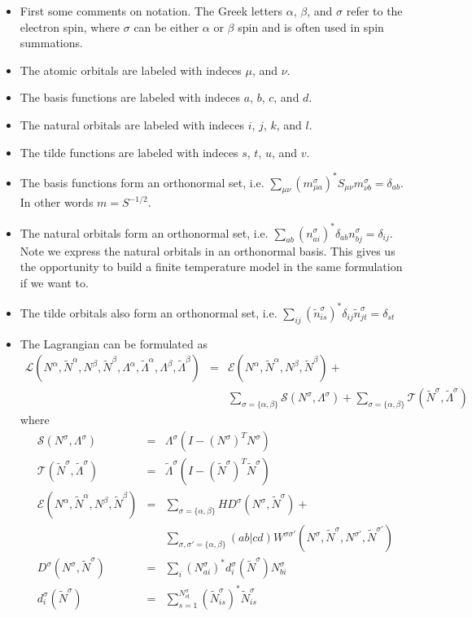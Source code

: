 \documentclass[aip,graphicx]{revtex4-1}
\newcommand{\nnq}[2]{n_{#1}^{#2}}
\newcommand{\nnqd}[2]{\left(n_{#1}^{#2}\right)^{*}}
\newcommand{\nns}[1]{\nnq{#1}{\sigma}}
\newcommand{\nnsd}[1]{\nnqd{#1}{\sigma}}
\newcommand{\nNq}[1]{N^{#1}}
\newcommand{\nNa}{\nNq{\alpha}}
\newcommand{\nNb}{\nNq{\beta}}
\newcommand{\nNs}{\nNq{\sigma}}
\newcommand{\nNt}{\nNq{\sigma'}}
\newcommand{\nNsd}[1]{\left(\nNq{\sigma}_{#1}\right)^{*}}
\newcommand{\mns}[1]{m_{#1}^{\sigma}}
\newcommand{\mnsd}[1]{\left(\mns{#1}\right)^{*}}
\newcommand{\tnq}[2]{\tilde{n}_{#1}^{#2}}
\newcommand{\tnqd}[2]{\left(\tilde{n}_{#1}^{#2}\right)^{*}}
\newcommand{\tns}[1]{\tnq{#1}{\sigma}}
\newcommand{\tnsd}[1]{\tnqd{#1}{\sigma}}
\newcommand{\tNq}[1]{\tilde{N}^{#1}}
\newcommand{\tNa}{\tNq{\alpha}}
\newcommand{\tNb}{\tNq{\beta}}
\newcommand{\tNs}{\tNq{\sigma}}
\newcommand{\tNt}{\tNq{\sigma'}}
\newcommand{\tNsd}[1]{\left(\tNq{\sigma}_{#1}\right)^{*}}
\newcommand{\dq}[2]{d_{#1}^{#2}}
\newcommand{\ds}[1]{\dq{#1}{\sigma}}
\newcommand{\Dq}[1]{D^{#1}}
\newcommand{\Ds}{\Dq{\sigma}}
\newcommand{\Wqq}[2]{W^{#1 #2}}
\newcommand{\Wst}{\Wqq{\sigma}{\sigma'}}
\newcommand{\nLq}[1]{\Lambda^{#1}}
\newcommand{\nLa}{\nLq{\alpha}}
\newcommand{\nLb}{\nLq{\beta}}
\newcommand{\nLs}{\nLq{\sigma}}
\newcommand{\tLq}[1]{\tilde{\Lambda}^{#1}}
\newcommand{\tLa}{\tLq{\alpha}}
\newcommand{\tLb}{\tLq{\beta}}
\newcommand{\tLs}{\tLq{\sigma}}
\newcommand{\nel}{N_{\mathrm{el}}}
\newcommand{\nelq}[1]{\nel^{#1}}
\newcommand{\nels}{\nelq{\sigma}}
\begin{document}
\begin{itemize}
\item First some comments on notation. The Greek letters $\alpha$, $\beta$, and $\sigma$ refer to the electron spin, where $\sigma$ can be either $\alpha$ or $\beta$ spin and is often used in spin summations.
\item The atomic orbitals are labeled with indeces $\mu$, and $\nu$.
\item The basis functions are labeled with indeces $a$, $b$, $c$, and $d$.
\item The natural orbitals are labeled with indeces $i$, $j$, $k$, and $l$.
\item The tilde functions are labeled with indeces $s$, $t$, $u$, and $v$.
\item The basis functions form an orthonormal set, i.e. $\sum_{\mu\nu}\mnsd{\mu a}S_{\mu\nu}\mns{\nu b} = \delta_{ab}$. In other words $m = S^{-1/2}$.
\item The natural orbitals form an orthonormal set, i.e. $\sum_{ab}\nnsd{ai}\delta_{ab}\nns{bj} = \delta_{ij}$. Note we express the natural orbitals in an orthonormal basis. This gives us the opportunity to build a finite temperature model in the same formulation if we want to.
\item The tilde orbitals also form an orthonormal set, i.e. $\sum_{ij}\tnsd{is}\delta_{ij}\tns{jt} = \delta_{st}$
\item The Lagrangian can be formulated as
      \begin{eqnarray}
      \mathcal{L}(\nNa,\tNa,\nNb,\tNb,\nLa,\tLa,\nLb,\tLb) &=& 
      \mathcal{E}(\nNa,\tNa,\nNb,\tNb) + \nonumber\\
      &&\sum_{\sigma=\{\alpha,\beta\}}\mathcal{S}(\nNs,\nLs) +
      \sum_{\sigma=\{\alpha,\beta\}}\mathcal{T}(\tNs,\tLs)
      \end{eqnarray}
      where
      \begin{eqnarray}
      \mathcal{S}(\nNs,\nLs) &=& \nLs\left(I-\left(\nNs\right)^T \nNs\right) \\
      \mathcal{T}(\tNs,\tLs) &=& \tLs\left(I-\left(\tNs\right)^T \tNs\right) \\
      \mathcal{E}(\nNa,\tNa,\nNb,\tNb) &=& \sum_{\sigma=\{\alpha,\beta\}}H\Ds(\nNs,\tNs) + \nonumber\\
      && \sum_{\sigma,\sigma'=\{\alpha,\beta\}}(ab|cd)\Wst(\nNs,\tNs,\nNt,\tNt) \\
      \Ds(\nNs,\tNs) &=& \sum_i \nNsd{ai} \ds{i}(\tNs) \nNs_{bi} \\
      \ds{i}(\tNs) &=& \sum_{s=1}^{\nels}\tNsd{is}\tNs_{is} \\

\end{eqnarray}
\end{itemize}
\end{document}
